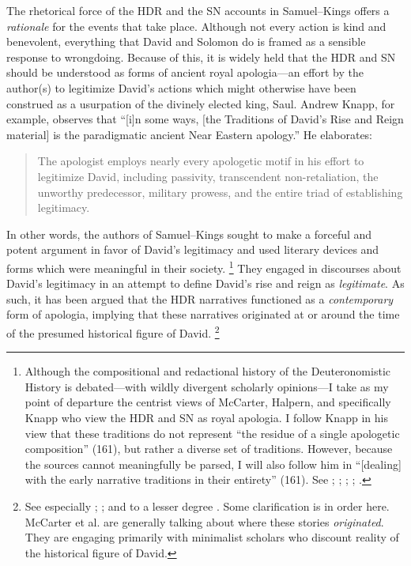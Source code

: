The rhetorical force of the HDR and the SN accounts in Samuel--Kings offers a \emph{rationale} for the events that take place. Although not every action is kind and benevolent, everything that David and Solomon do is framed as a sensible response to wrongdoing. Because of this, it is widely held that the HDR and SN should be understood as forms of ancient royal apologia---an effort by the author(s) to legitimize David's actions which might otherwise have been construed as a usurpation of the divinely elected king, Saul. Andrew Knapp, for example, observes that ``[i]n some ways, [the Traditions of David's Rise and Reign material] is the paradigmatic ancient Near Eastern apology.''%
    \autocite[218]{knapp2015}
He elaborates:
\begin{quote}
    The apologist employs nearly every apologetic motif in his effort to legitimize David, including passivity, transcendent non-retaliation, the unworthy predecessor, military prowess, and the entire triad of establishing legitimacy.%
\autocite{knapp2015}
\end{quote}
\noindent
In other words, the authors of Samuel--Kings sought to make a forceful and potent argument in favor of David's legitimacy and used literary devices and forms which were meaningful in their society.%
    \footnote{Although the compositional and redactional history of the Deuteronomistic History is debated---with wildly divergent scholarly opinions---I take as my point of departure the centrist views of McCarter, Halpern, and specifically Knapp who view the HDR and SN as royal apologia. I follow Knapp in his view that these traditions do not represent ``the residue of a single apologetic composition'' (161), but rather a diverse set of traditions. However, because the sources cannot meaningfully be parsed, I will also follow him in ``[dealing] with the early narrative traditions in their entirety'' (161). See 
        \cite{knapp2015};
        \cite{mccarter_interpretation1981};
        \cite{mccarter_jbl1980};
        \cite{mccarter1980};
        \cite{halpern2001}.}
They engaged in discourses about David's legitimacy in an attempt to define David's rise and reign as \emph{legitimate}. As such, it has been argued that the HDR narratives functioned as a \emph{contemporary} form of apologia, implying that these narratives originated at or around the time of the presumed historical figure of David.%
    \footnote{See especially \cite{mccarter_interpretation1981}; \cite{mccarter_jbl1980}; and to a lesser degree \cite[75--76]{halpern2001}. Some clarification is in order here. McCarter et al. are generally talking about where these stories \emph{originated}. They are engaging primarily with minimalist scholars who discount reality of the historical figure of David.}
